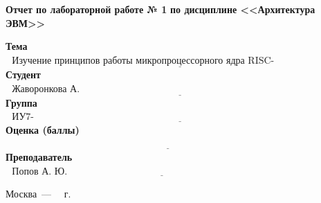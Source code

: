 \begin{titlepage}
	
	\begin{center}
		\noindent\begin{minipage}{1.3\textwidth}\centering
			\Large\textbf{   Отчет по лабораторной работе № 1}\newline
			\textbf{по дисциплине <<Архитектура ЭВМ>>}\newline\newline\newline
		\end{minipage}
	\end{center}
	
	\noindent\textbf{Тема} $\underline{\text{~~Изучение принципов работы микропроцессорного ядра RISC-V~~~~~~~~~~~~~~~~~~~~~~~~~~~~~}}$\newline\newline\newline
	\noindent\textbf{Студент} $\underline{\text{~~Жаворонкова А. А.~~~~~~~~~~~~~~~~~~~~~~~~~~~~~~~~~~~~~~~~~~~~~~~~~~~~~~~~~~~~~~~~~~~~~~~~~~~~~~~~~~~~~~~~~}}$\newline\newline
	\noindent\textbf{Группа} $\underline{\text{~~ИУ7-56Б~~~~~~~~~~~~~~~~~~~~~~~~~~~~~~~~~~~~~~~~~~~~~~~~~~~~~~~~~~~~~~~~~~~~~~~~~~~~~~~~~~~~~~~~~~~~~~~~~~~~}}$\newline\newline
	\noindent\textbf{Оценка (баллы)} $\underline{\text{~~~~~~~~~~~~~~~~~~~~~~~~~~~~~~~~~~~~~~~~~~~~~~~~~~~~~~~~~~~~~~~~~~~~~~~~~~~~~~~~~~~~~~~~~~~~~~~~~~~~~}}$\newline\newline
	\noindent\textbf{Преподаватель} $\underline{\text{~~Попов А. Ю.~~~~~~~~~~~~~~~~~~~~~~~~~~~~~~~~~~~~~~~~~~~~~~~~~~~~~~~~~~~~~~~~~~~~~~~~~~~~~~}}$\newline
	
	\begin{center}
		\vfill
		Москва~---~\the\year
		~г.
	\end{center}
	\restoregeometry
\end{titlepage}
